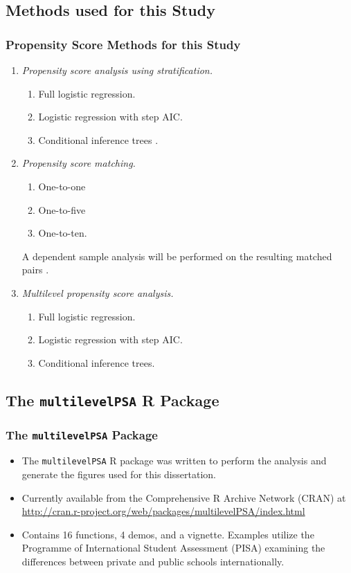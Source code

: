 \documentclass[10pt,handout,mathserif]{beamer}
\begin{document}
\subsection{Methods used for this Study}

\begin{frame}
	\frametitle{Propensity Score Methods for this Study}
	\begin{enumerate}
	    \setlength{\itemsep}{15pt}

		\item \textit{Propensity score analysis using stratification.}
		\begin{enumerate}
			\item Full logistic regression. 
			\item Logistic regression with step AIC.
			\item Conditional inference trees \cite{HorthornHornikZeileis2006}.
		\end{enumerate}
	\pause
	\item \textit{Propensity score matching.} 
		\begin{enumerate}
			\item One-to-one
			\item One-to-five
			\item One-to-ten.
		\end{enumerate}
		A dependent sample analysis will be performed on the resulting matched pairs \cite{Austin2011}.
	\pause
	\item \textit{Multilevel propensity score analysis.}
		\begin{enumerate}
			\item Full logistic regression.
			\item Logistic regression with step AIC.
			\item Conditional inference trees.
		\end{enumerate}
	\end{enumerate}
\end{frame}

\subsection{The \texttt{multilevelPSA} R Package}

\begin{frame}[c]
    \frametitle{The \texttt{multilevelPSA} Package}
    \begin{itemize}
        \setlength{\itemsep}{15pt}
        \item The \texttt{multilevelPSA} R package was written to perform the analysis and generate the figures used for this dissertation.
        \item Currently available from the Comprehensive R Archive Network (CRAN) at \url{http://cran.r-project.org/web/packages/multilevelPSA/index.html}
        \item Contains 16 functions, 4 demos, and a vignette. Examples utilize the Programme of International Student Assessment (PISA) examining the differences between private and public schools internationally.
    \end{itemize}
\end{frame}
\end{document}
